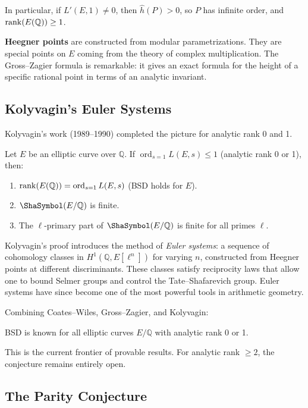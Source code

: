 In particular, if $L'(E, 1) \neq 0$, then $\hat{h}(P) > 0$, so $P$ has infinite order, and $\operatorname{rank}(E(\mathbb{Q})) \ge 1$.

\textbf{Heegner points} are constructed from modular parametrizations. They are special points on $E$ coming from the theory of complex multiplication. The Gross--Zagier formula is remarkable: it gives an exact formula for the height of a specific rational point in terms of an analytic invariant.

\subsection{Kolyvagin's Euler Systems}

Kolyvagin's work (1989--1990) completed the picture for analytic rank 0 and 1.

\begin{theorem}[Kolyvagin]
Let $E$ be an elliptic curve over $\mathbb{Q}$. If $\operatorname{ord}_{s=1} L(E, s) \le 1$ (analytic rank 0 or 1), then:
\begin{enumerate}
\item $\operatorname{rank}(E(\mathbb{Q})) = \operatorname{ord}_{s=1} L(E, s)$ (BSD holds for $E$).
\item $\Sha(E/\mathbb{Q})$ is finite.
\item The $\ell$-primary part of $\Sha(E/\mathbb{Q})$ is finite for all primes $\ell$.
\end{enumerate}
\end{theorem}

Kolyvagin's proof introduces the method of \emph{Euler systems}: a sequence of cohomology classes in $H^1(\mathbb{Q}, E[\ell^n])$ for varying $n$, constructed from Heegner points at different discriminants. These classes satisfy reciprocity laws that allow one to bound Selmer groups and control the Tate--Shafarevich group. Euler systems have since become one of the most powerful tools in arithmetic geometry.

Combining Coates--Wiles, Gross--Zagier, and Kolyvagin:

\begin{corollary}
BSD is known for all elliptic curves $E/\mathbb{Q}$ with analytic rank 0 or 1.
\end{corollary}

This is the current frontier of provable results. For analytic rank $\ge 2$, the conjecture remains entirely open.

\subsection{The Parity Conjecture}

